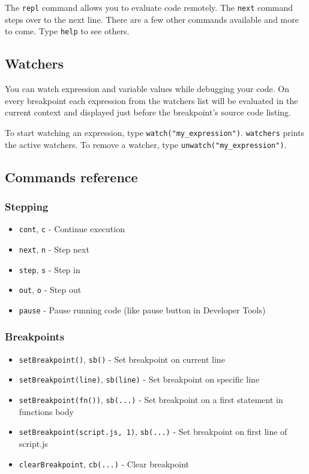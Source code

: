 The \texttt{repl} command allows you to evaluate code remotely. The
\texttt{next} command steps over to the next line. There are a few other
commands available and more to come. Type \texttt{help} to see others.

\subsection{Watchers}\label{watchers}

You can watch expression and variable values while debugging your code.
On every breakpoint each expression from the watchers list will be
evaluated in the current context and displayed just before the
breakpoint's source code listing.

To start watching an expression, type \texttt{watch("my\_expression")}.
\texttt{watchers} prints the active watchers. To remove a watcher, type
\texttt{unwatch("my\_expression")}.

\subsection{Commands reference}\label{commands-reference}

\subsubsection{Stepping}\label{stepping}

\begin{itemize}
\itemsep1pt\parskip0pt
\item
  \texttt{cont}, \texttt{c} - Continue execution
\item
  \texttt{next}, \texttt{n} - Step next
\item
  \texttt{step}, \texttt{s} - Step in
\item
  \texttt{out}, \texttt{o} - Step out
\item
  \texttt{pause} - Pause running code (like pause button in Developer
  Tools)
\end{itemize}

\subsubsection{Breakpoints}\label{breakpoints}

\begin{itemize}
\itemsep1pt\parskip0pt
\item
  \texttt{setBreakpoint()}, \texttt{sb()} - Set breakpoint on current
  line
\item
  \texttt{setBreakpoint(line)}, \texttt{sb(line)} - Set breakpoint on
  specific line
\item
  \texttt{setBreakpoint(\textquotesingle{}fn()\textquotesingle{})},
  \texttt{sb(...)} - Set breakpoint on a first statement in functions
  body
\item
  \texttt{setBreakpoint(\textquotesingle{}script.js\textquotesingle{},\ 1)},
  \texttt{sb(...)} - Set breakpoint on first line of script.js
\item
  \texttt{clearBreakpoint}, \texttt{cb(...)} - Clear breakpoint
\end{itemize}


